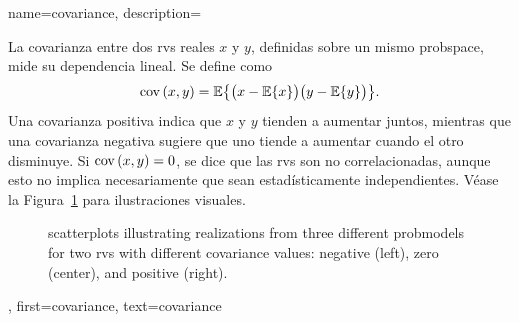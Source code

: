    {name={covariance}, 
	description={La covarianza entre dos \glspl{rv} reales $x$ y $y$, definidas sobre un mismo \gls{probspace}, mide su dependencia lineal. Se define como 
			   $$
			   {\rm cov}\left(x,y\right) = \mathbb{E}\big\{ \big(x - \mathbb{E}\{ x\} \big)\big(y - \mathbb{E}\{y\} \big)\big\}.
			   $$
			   Una covarianza positiva indica que $x$ y $y$ tienden a aumentar juntos, mientras que una covarianza negativa sugiere que uno tiende a aumentar cuando el otro disminuye. Si ${\rm cov}\left(x,y\right) = 0$, se dice que las \glspl{rv} son no correlacionadas, aunque esto no implica necesariamente que sean estadísticamente independientes. Véase la Figura~\ref{fig:covariance-examples_dict} para ilustraciones visuales.
		   \begin{figure}
			   \caption{\Glspl{scatterplot} illustrating \glspl{realization} from three different \glspl{probmodel} for two 
				   \glspl{rv} with different covariance values: negative (left), zero (center), and positive (right).}
			   \label{fig:covariance-examples_dict}
		   \end{figure}
		   },
	   first={covariance},
	   text={covariance} 
   }


